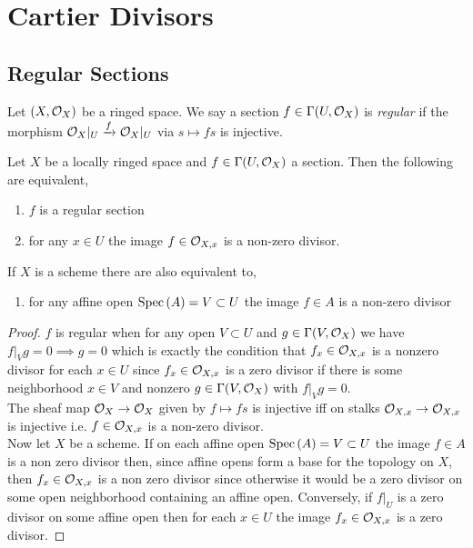 \documentclass[12pt]{article}
\begin{document}
\section{Cartier Divisors}

\subsection{Regular Sections}

\begin{definition}
Let $(X, \mathcal{O}_{X})$ be a ringed space. We say a section $f \in \Gamma(U, \mathcal{O}_{X})$ is \textit{regular} if the morphism $\mathcal{O}_{X}|_U \xrightarrow{f} \mathcal{O}_{X}|_U$ via $s \mapsto f s$ is injective.
\end{definition}

\begin{lemma}
Let $X$ be a locally ringed space and $f \in \Gamma(U, \mathcal{O}_{X})$ a section. Then the following are equivalent,
\begin{enumerate}
\item $f$ is a regular section 
\item for any $x \in U$ the image $f \in \mathcal{O}_{X, x}$ is a non-zero divisor.
\end{enumerate}
If $X$ is a scheme there are also equivalent to,
\begin{enumerate}
\item for any affine open $\mathrm{Spec}\left( A \right) = V \subset U$ the image $f \in A$ is a non-zero divisor
\end{enumerate}
\end{lemma}

\begin{proof}
$f$ is regular when for any open $V \subset U$ and $g \in \Gamma(V, \mathcal{O}_{X})$ we have $f|_V g = 0 \implies g = 0$ which is exactly the condition that $f_x \in \mathcal{O}_{X, x}$ is a nonzero divisor for each $x \in U$ since $f_x \in \mathcal{O}_{X, x}$ is a zero divisor if there is some neighborhood $x \in V$ and nonzero $g \in \Gamma(V, \mathcal{O}_{X})$ with $f|_V g = 0$. 
\bigskip\\
The sheaf map $\mathcal{O}_{X} \to \mathcal{O}_{X}$ given by $f \mapsto fs$ is injective iff on stalks $\mathcal{O}_{X, x} \to \mathcal{O}_{X, x}$ is injective i.e. $f \in \mathcal{O}_{X, x}$ is a non-zero divisor. 
\bigskip\\
Now let $X$ be a scheme. If on each affine open $\mathrm{Spec}\left( A \right) = V \subset U$ the image $f \in A$ is a non zero divisor then, since affine opens form a base for the topology on $X$, then $f_x \in \mathcal{O}_{X, x}$ is a non zero divisor since otherwise it would be a zero divisor on some open neighborhood containing an affine open. Conversely, if $f |_U$ is a zero divisor on some affine open then for each $x \in U$ the image $f_x \in \mathcal{O}_{X, x}$ is a zero divisor.
\end{proof}
\end{document}
